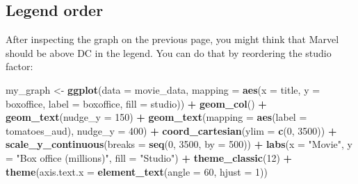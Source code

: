 \documentclass[
]{krantz}
\makeatletter
\newenvironment{Shaded}{\begin{snugshade}}{\end{snugshade}}
\newcommand{\DataTypeTok}[1]{\textcolor[rgb]{0.27,0.27,0.27}{#1}}
\newcommand{\DecValTok}[1]{\textcolor[rgb]{0.06,0.06,0.06}{#1}}
\newcommand{\KeywordTok}[1]{\textcolor[rgb]{0.27,0.27,0.27}{\textbf{#1}}}
\newcommand{\NormalTok}[1]{#1}
\newcommand{\OperatorTok}[1]{\textcolor[rgb]{0.43,0.43,0.43}{\textbf{#1}}}
\newcommand{\StringTok}[1]{\textcolor[rgb]{0.5,0.5,0.5}{#1}}
\newenvironment{kframe}{%
\medskip{}
\setlength{\fboxsep}{.8em}
 \def\at@end@of@kframe{}%
 \ifinner\ifhmode%
  \def\at@end@of@kframe{\end{minipage}}%
  \begin{minipage}{\columnwidth}%
 \fi\fi%
 \def\FrameCommand##1{\hskip\@totalleftmargin \hskip-\fboxsep
 \colorbox{shadecolor}{##1}\hskip-\fboxsep
     \hskip-\linewidth \hskip-\@totalleftmargin \hskip\columnwidth}%
 \MakeFramed {\advance\hsize-\width
   \@totalleftmargin\z@ \linewidth\hsize
   \@setminipage}}%
 {\par\unskip\endMakeFramed%
 \at@end@of@kframe}
\renewenvironment{Shaded}{\begin{kframe}}{\end{kframe}}
\makeatother
\begin{document}
\hypertarget{legend-order}{%
\subsection{Legend order}\label{legend-order}}

After inspecting the graph on the previous page, you might think that Marvel should be above DC in the legend. You can do that by reordering the studio factor:

\begin{Shaded}
\end{Shaded}

\begin{Shaded}
\begin{Highlighting}[]
\NormalTok{my_graph <-}\StringTok{ }\KeywordTok{ggplot}\NormalTok{(}\DataTypeTok{data =}\NormalTok{ movie_data,}
           \DataTypeTok{mapping =} \KeywordTok{aes}\NormalTok{(}\DataTypeTok{x =}\NormalTok{ title,}
                         \DataTypeTok{y =}\NormalTok{ boxoffice,}
                         \DataTypeTok{label =}\NormalTok{ boxoffice, }
                         \DataTypeTok{fill =}\NormalTok{ studio)) }\OperatorTok{+}
\StringTok{  }\KeywordTok{geom_col}\NormalTok{() }\OperatorTok{+}
\StringTok{  }\KeywordTok{geom_text}\NormalTok{(}\DataTypeTok{nudge_y =} \DecValTok{150}\NormalTok{)  }\OperatorTok{+}
\StringTok{  }\KeywordTok{geom_text}\NormalTok{(}\DataTypeTok{mapping =} \KeywordTok{aes}\NormalTok{(}\DataTypeTok{label =}\NormalTok{ tomatoes_aud), }
            \DataTypeTok{nudge_y =} \DecValTok{400}\NormalTok{) }\OperatorTok{+}
\StringTok{  }\KeywordTok{coord_cartesian}\NormalTok{(}\DataTypeTok{ylim =} \KeywordTok{c}\NormalTok{(}\DecValTok{0}\NormalTok{, }\DecValTok{3500}\NormalTok{)) }\OperatorTok{+}
\StringTok{  }\KeywordTok{scale_y_continuous}\NormalTok{(}\DataTypeTok{breaks =} \KeywordTok{seq}\NormalTok{(}\DecValTok{0}\NormalTok{, }\DecValTok{3500}\NormalTok{, }\DataTypeTok{by =} \DecValTok{500}\NormalTok{)) }\OperatorTok{+}
\StringTok{  }\KeywordTok{labs}\NormalTok{(}\DataTypeTok{x =} \StringTok{"Movie"}\NormalTok{,}
       \DataTypeTok{y =} \StringTok{"Box office (millions)"}\NormalTok{,}
       \DataTypeTok{fill =} \StringTok{"Studio"}\NormalTok{) }\OperatorTok{+}
\StringTok{  }\KeywordTok{theme_classic}\NormalTok{(}\DecValTok{12}\NormalTok{) }\OperatorTok{+}
\StringTok{  }\KeywordTok{theme}\NormalTok{(}\DataTypeTok{axis.text.x =} \KeywordTok{element_text}\NormalTok{(}\DataTypeTok{angle =} \DecValTok{60}\NormalTok{, }
                                   \DataTypeTok{hjust =} \DecValTok{1}\NormalTok{))  }
\end{Highlighting}
\end{Shaded}
\end{document}
